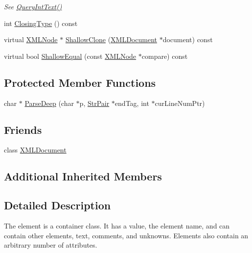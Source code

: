 \begin{DoxyCompactItemize}
\begin{DoxyCompactList}\small\item\em See \hyperlink{classtinyxml2_1_1_x_m_l_element_a926357996bef633cb736e1a558419632}{Query\+Int\+Text()} \end{DoxyCompactList}\item 
int \hyperlink{classtinyxml2_1_1_x_m_l_element_ac820806b6c14af6833dcbcf0957b6d61}{Closing\+Type} () const
\item 
virtual \hyperlink{classtinyxml2_1_1_x_m_l_node}{X\+M\+L\+Node} $\ast$ \hyperlink{classtinyxml2_1_1_x_m_l_element_aafa2807a45b28fe096b29d76e6a13b7c}{Shallow\+Clone} (\hyperlink{classtinyxml2_1_1_x_m_l_document}{X\+M\+L\+Document} $\ast$document) const
\item 
virtual bool \hyperlink{classtinyxml2_1_1_x_m_l_element_a61ffd7bf918a9db4aa6203d855ac5ec2}{Shallow\+Equal} (const \hyperlink{classtinyxml2_1_1_x_m_l_node}{X\+M\+L\+Node} $\ast$compare) const
\end{DoxyCompactItemize}
\subsection*{Protected Member Functions}
\begin{DoxyCompactItemize}
\item 
char $\ast$ \hyperlink{classtinyxml2_1_1_x_m_l_element_a0b300321c15576ec02a78422c3796a13}{Parse\+Deep} (char $\ast$p, \hyperlink{classtinyxml2_1_1_str_pair}{Str\+Pair} $\ast$end\+Tag, int $\ast$cur\+Line\+Num\+Ptr)
\end{DoxyCompactItemize}
\subsection*{Friends}
\begin{DoxyCompactItemize}
\item 
class \hyperlink{classtinyxml2_1_1_x_m_l_element_a4eee3bda60c60a30e4e8cd4ea91c4c6e}{X\+M\+L\+Document}
\end{DoxyCompactItemize}
\subsection*{Additional Inherited Members}


\subsection{Detailed Description}
The element is a container class. It has a value, the element name, and can contain other elements, text, comments, and unknowns. Elements also contain an arbitrary number of attributes. 

